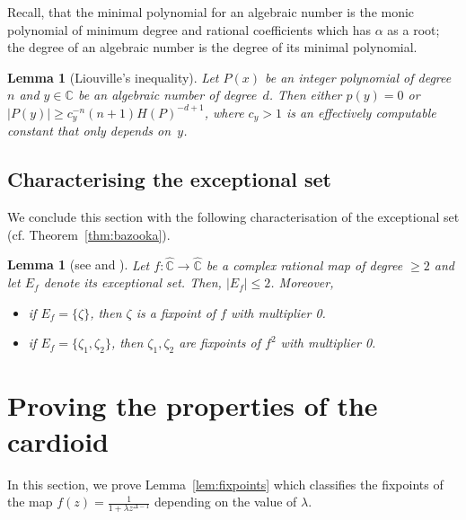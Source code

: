 \documentclass[11pt]{article}
\newtheorem{lemma}[theorem]{Lemma}
\def\Complex{\mathbb{C}}
\def\Riem{\widehat{\Complex}}
\newcommand{\fn}[2]{#1^{#2}}
\begin{document}
Recall, that the minimal polynomial for an algebraic number is the monic polynomial of minimum degree and rational coefficients which has $\alpha$ as a root; the degree of an algebraic number is the degree of its minimal polynomial. 
\begin{lemma}[Liouville's inequality]
\label{lem:use}Let $P(x)$ be an integer polynomial of degree~$n$ and $y\in \Complex$ be an algebraic number of degree~$d$.
Then either $p(y)=0$ or $|P(y)| \geq c_y^{-n} {(n+1)H(P)}^{-d+1}$,
where $c_y>1$ is an effectively computable constant that only depends on~$y$.
\end{lemma}

\subsection{Characterising the exceptional set}
We conclude this section with the following characterisation of the exceptional set (cf. Theorem~\ref{thm:bazooka}).
\begin{lemma}[see {\cite[Lemma 4.9]{Milnor}} and {\cite[Theorem 4.1.2]{Beardon}}]\label{lem:except}
Let $f:\Riem\rightarrow \Riem$ be a complex rational map of degree $\geq 2$ and let $E_f$ denote its exceptional set. Then, $|E_f|\leq 2$. Moreover, 
\begin{itemize}
\item if $E_f=\{\zeta\}$, then $\zeta$ is a fixpoint of $f$ with multiplier 0.
\item if $E_f=\{\zeta_1,\zeta_2\}$, then $\zeta_1,\zeta_2$ are fixpoints of $\fn{f}{2}$ with multiplier 0.
\end{itemize}
\end{lemma}






\section{Proving the properties of the cardioid}\label{sec:cardioid}
In this section, we prove Lemma~\ref{lem:fixpoints} which classifies the fixpoints of the map $f(z)=\frac{1}{1+\lambda z^{\Delta-1}}$ depending on the value of $\lambda$. 
\end{document}
